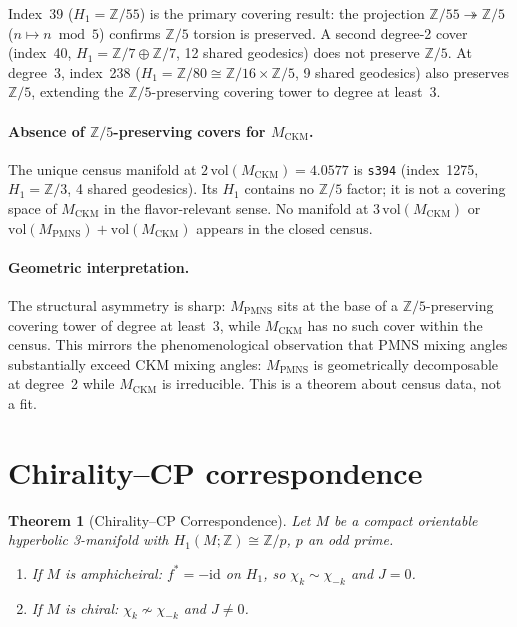 \documentclass[12pt]{article}
\newtheorem{theorem}{Theorem}
\theoremstyle{definition}
\begin{document}
Index~39 ($H_1=\mathbb{Z}/55$) is the primary covering result: the projection
$\mathbb{Z}/55\twoheadrightarrow\mathbb{Z}/5$ ($n\mapsto n\bmod 5$) confirms
$\mathbb{Z}/5$ torsion is preserved. A second degree-2 cover (index~40,
$H_1=\mathbb{Z}/7\oplus\mathbb{Z}/7$, 12 shared geodesics) does not preserve
$\mathbb{Z}/5$. At degree~3, index~238 ($H_1=\mathbb{Z}/80\cong\mathbb{Z}/16\times\mathbb{Z}/5$,
9 shared geodesics) also preserves $\mathbb{Z}/5$, extending the
$\mathbb{Z}/5$-preserving covering tower to degree at least~3.

\paragraph{Absence of $\mathbb{Z}/5$-preserving covers for $M_\mathrm{CKM}$.}
The unique census manifold at $2\,\mathrm{vol}(M_\text{CKM})=4.0577$ is
\texttt{s394} (index~1275, $H_1=\mathbb{Z}/3$, 4 shared geodesics).
Its $H_1$ contains no $\mathbb{Z}/5$ factor; it is not a covering space
of $M_\text{CKM}$ in the flavor-relevant sense.
No manifold at $3\,\mathrm{vol}(M_\text{CKM})$ or
$\mathrm{vol}(M_\text{PMNS})+\mathrm{vol}(M_\text{CKM})$ appears in the
closed census.

\paragraph{Geometric interpretation.}
The structural asymmetry is sharp: $M_\text{PMNS}$ sits at the base of a
$\mathbb{Z}/5$-preserving covering tower of degree at least~3, while
$M_\text{CKM}$ has no such cover within the census. This mirrors the
phenomenological observation that PMNS mixing angles substantially exceed
CKM mixing angles: $M_\text{PMNS}$ is geometrically decomposable at
degree~2 while $M_\text{CKM}$ is irreducible. This is a theorem about
census data, not a fit.

\section{Chirality--CP correspondence}
\label{sec:chirality}

\begin{theorem}[Chirality--CP Correspondence]
Let $M$ be a compact orientable hyperbolic 3-manifold with
$H_1(M;\mathbb{Z})\cong\mathbb{Z}/p$, $p$ an odd prime.
\begin{enumerate}
\item If $M$ is amphicheiral: $f^*=-\mathrm{id}$ on $H_1$,
      so $\chi_k\sim\chi_{-k}$ and $J=0$.
\item If $M$ is chiral: $\chi_k\not\sim\chi_{-k}$ and $J\neq0$.
\end{enumerate}
\end{theorem}
\end{document}
